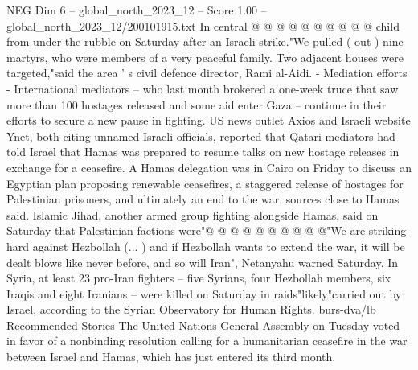 \begin{textsample}{NEG Dim 6 – global\_north\_2023\_12 – Score 1.00 – global\_north\_2023\_12/200101915.txt}
In central @ @ @ @ @ @ @ @ @ @ child from under the rubble on Saturday after an Israeli strike."We pulled ( out ) nine martyrs, who were members of a very peaceful family.
Two adjacent houses were targeted,"said the area ' s civil defence director, Rami al-Aidi. - Mediation efforts - International mediators -- who last month brokered a one-week truce that saw more than 100 hostages released and some aid enter Gaza -- continue in their efforts to secure a new pause in fighting.
US news outlet Axios and Israeli website Ynet, both citing unnamed Israeli officials, reported that Qatari mediators had told Israel that Hamas was prepared to resume talks on new hostage releases in exchange for a ceasefire.
A Hamas delegation was in Cairo on Friday to discuss an Egyptian plan proposing renewable ceasefires, a staggered release of hostages for Palestinian prisoners, and ultimately an end to the war, sources close to Hamas said.
Islamic Jihad, another armed group fighting alongside Hamas, said on Saturday that Palestinian factions were"@ @ @ @ @ @ @ @ @ @"We are striking hard against Hezbollah (... ) and if Hezbollah wants to extend the war, it will be dealt blows like never before, and so will Iran", Netanyahu warned Saturday.
In Syria, at least 23 pro-Iran fighters -- five Syrians, four Hezbollah members, six Iraqis and eight Iranians -- were killed on Saturday in raids"likely"carried out by Israel, according to the Syrian Observatory for Human Rights. burs-dva/lb Recommended Stories The United Nations General Assembly on Tuesday voted in favor of a nonbinding resolution calling for a humanitarian ceasefire in the war between Israel and Hamas, which has just entered its third month.

\end{textsample}
